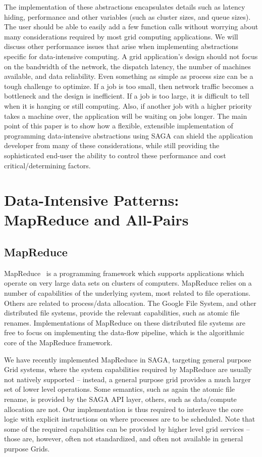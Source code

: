 \documentclass[conference,final]{IEEEtran}
\begin{document}
The implementation of these abstractions encapsulates details such as
latency hiding, performance and other variables (such as cluster
sizes, and queue sizes).  The user should be able to easily add a few
function calls without worrying about many considerations required by
most grid computing applications.  We will discuss other performance
issues that arise when implementing abstractions specific for
data-intensive computing.  A grid application's design should not
focus on the bandwidth of the network, the dispatch latency, the
number of machines available, and data reliability.  Even something as
simple as process size can be a tough challenge to optimize.  If a job
is too small, then network traffic becomes a bottleneck and the design
is inefficient.  If a job is too large, it is difficult to tell when
it is hanging or still computing.  Also, if another job with a higher
priority takes a machine over, the application will be waiting on jobs
longer.  The main point of this paper is to show how a flexible,
extensible implementation of programming data-intensive abstractions
using SAGA can shield the application developer from many of these
considerations, while still providing the sophisticated end-user the
ability to control these performance and cost critical/determining
factors.

\section{Data-Intensive Patterns: MapReduce and All-Pairs}

\subsection{MapReduce}

MapReduce~\cite{mapreduce-paper} is a programming framework which
supports applications which operate on very large data sets on
clusters of computers.  MapReduce relies on a number of capabilities
of the underlying system, most related to file operations.  Others are 
related to process/data allocation.  The Google File System, and other
distributed file systems, provide the relevant capabilities, such as atomic
file renames.  Implementations of MapReduce on these distributed file systems
are free to focus on implementing the data-flow pipeline, which is the
algorithmic core of the MapReduce framework.

We have recently implemented MapReduce in SAGA, targeting general
purpose Grid systems, where the system capabilities required by
MapReduce are usually not natively supported -- instead, a general
purpose grid provides a much larger set of lower level operations.
Some semantics, such as again the atomic file rename, is provided by
the SAGA API layer, others, such as data/compute allocation are not.
Our implementation is thus required to interleave the core logic with
explicit instructions on where processes are to be scheduled.  Note
that some of the required capabilities can be provided by higher level
grid services -- those are, however, often not standardized, and often
not available in general purpose Grids.
\end{document}
